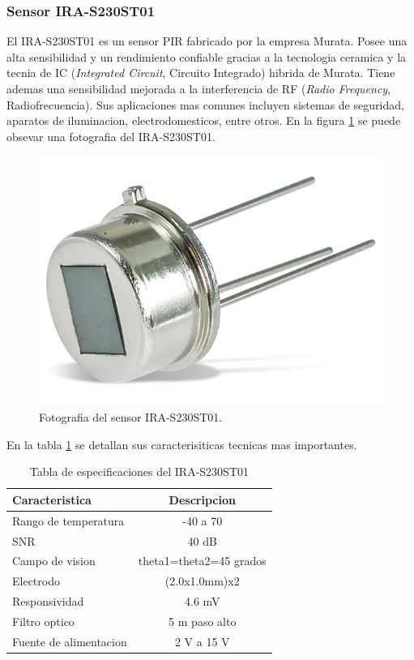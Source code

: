 \subsubsection{Sensor IRA-S230ST01}
El IRA-S230ST01 es un sensor PIR fabricado por la empresa Murata. Posee una alta sensibilidad y un rendimiento confiable gracias a la tecnologia ceramica y la tecnia de IC (\textit{Integrated Circuit}, Circuito Integrado) hibrida de Murata. Tiene ademas una sensibilidad mejorada a la interferencia de RF (\textit{Radio Frequency}, Radiofrecuencia). Sus aplicaciones mas comunes incluyen sistemas de seguridad, aparatos de iluminacion, electrodomesticos, entre otros. En la figura \ref{fig:pir_photo} se puede obsevar una fotografia del IRA-S230ST01.

\begin{figure}[h]
	\centering
	\includegraphics[scale=0.3]{./Figures/pir_photo.png}
	\caption{Fotografia del sensor IRA-S230ST01.}
	\label{fig:pir_photo}
\end{figure}

En la tabla \ref{tab:pir_specs} se detallan sus caracterisiticas tecnicas mas importantes.

 \begin{table}[h]
	\centering
	\caption[IRA-S230ST01 especificaciones]{Tabla de especificaciones del IRA-S230ST01}
	\begin{tabular}{lc}    
		\toprule
		\textbf{Caracteristica} 	 & \textbf{Descripcion}  \\
		\midrule
		Rango de temperatura & -40 \textcelsius a 70 \textcelsius\\
		SNR & 40 dB \\
		Campo de vision & theta1=theta2=45 grados \\
		Electrodo & (2.0x1.0mm)x2 \\
		Responsividad & 4.6 mV \\
		Filtro optico & 5 \textmu m paso alto \\
		Fuente de alimentacion & 2 V a 15 V \\
		\bottomrule
		\hline
	\end{tabular}
	\label{tab:pir_specs}
\end{table}

